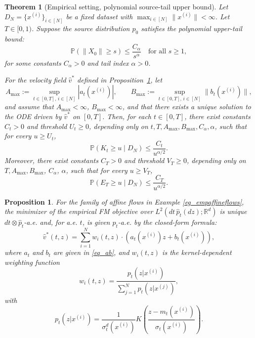 \documentclass[10pt,a4paper]{amsart}
\newtheorem{proposition}{Proposition}
\newtheorem{theorem}{Theorem}
\begin{document}
\begin{theorem}[Empirical setting, polynomial source-tail upper bound]
\label{thm2_polydecay}
Let $D_N = \{x^{(i)}\}_{i\in[N]}$ be a fixed  dataset with 
$\max_{i\in[N]} \|x^{(i)}\| < \infty$. Let $T \in [0,1)$.
Suppose the source distribution \(p_0\) satisfies the polynomial upper-tail bound:
\[
\mathbb{P}(\|X_0\| \ge s) \le \frac{C_\alpha}{s^\alpha}
\quad\text{for all } s \ge 1,
\]
for some constants $C_\alpha > 0$ and tail index $\alpha > 0$.

For the velocity field $\hat v^\ast$ defined in Proposition~\ref{prop1}, let
\[
A_{\max} := \sup_{t\in[0,T],\,i\in[N]} |a_t(x^{(i)})|,
\qquad
B_{\max} := \sup_{t\in[0,T],\,i\in[N]} \|b_t(x^{(i)})\|,
\]
and assume that \(A_{\max}<\infty\), \(B_{\max}<\infty\), and that there exists a unique solution to the ODE driven by $\hat v^\ast$
on $[0,T]$. Then, for each $t\in[0,T]$, there exist constants $C_t>0$ and threshold $U_t\ge 0$, depending only on $t, T, A_{\max}, B_{\max}, C_\alpha, \alpha$, such that for every $u\ge U_t$,
\[
\mathbb{P}(K_t \ge u \mid D_N) \le \frac{C_t}{u^{\alpha/2}}.
\]
Moreover, there exist constants $C_T>0$ and threshold $V_T\ge 0$, depending only on $T, A_{\max}, B_{\max}$, $C_\alpha$, $\alpha$, such that for every $u\ge V_T$,
\[
\mathbb{P}(E_T \ge u \mid D_N) \le \frac{C_T}{u^{\alpha/2}}.
\]
\end{theorem}

\begin{proposition} \label{prop1} 
For the family of affine flows in Example \ref{eg_empaffineflows}, the minimizer of the empirical FM objective over
\(L^2(dt\,\hat p_t(dz);\mathbb R^d)\) is unique \(dt\otimes \hat p_t\)-a.e. and, for a.e. \(t\), is given \(\hat p_t\)-a.e. by the closed-form formula:
    \begin{equation}
        \hat{v}^*(t, z) = \sum_{i=1}^N w_i(t,z) \cdot (a_t(x^{(i)}) z + b_t(x^{(i)})),
    \end{equation}
where $a_t$ and $b_t$ are given in \eqref{eq_ab}, and $w_i(t,z)$ is the kernel-dependent weighting function
\begin{equation}
    w_i(t,z) = \frac{p_t(z|x^{(i)})}{\sum_{j=1}^N p_t(z|x^{(j)})},
\end{equation}
with 
\begin{equation}
    p_t(z|x^{(i)}) = \frac{1}{\sigma_t^d(x^{(i)})} K\left(\frac{z-m_t(x^{(i)})}{\sigma_t(x^{(i)})} \right).
\end{equation}
\end{proposition}
\end{document}
